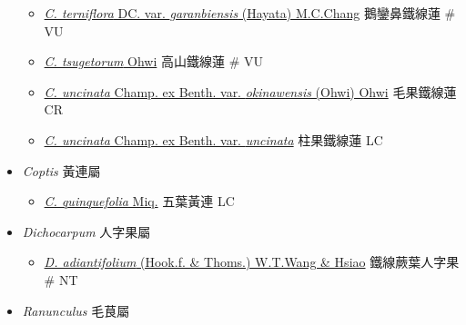 \begin{itemize}
\begin{itemize}
        \item[] \href{http://www.theplantlist.org/tpl1.1/search?q=Clematis+terniflora+var.+garanbiensis}{\textit{C. terniflora} DC. var. \textit{garanbiensis} (Hayata) M.C.Chang}   鵝鑾鼻鐵線蓮  \# VU
        \item[] \href{http://www.theplantlist.org/tpl1.1/search?q=Clematis+tsugetorum}{\textit{C. tsugetorum} Ohwi}   高山鐵線蓮  \# VU
        \item[] \href{http://www.theplantlist.org/tpl1.1/search?q=Clematis+uncinata+var.+okinawensis}{\textit{C. uncinata} Champ. ex Benth. var. \textit{okinawensis} (Ohwi) Ohwi}   毛果鐵線蓮   CR
        \item[] \href{http://www.theplantlist.org/tpl1.1/search?q=Clematis+uncinata+var.+uncinata}{\textit{C. uncinata} Champ. ex Benth. var. \textit{uncinata}}   柱果鐵線蓮   LC
  \end{itemize}
 \item[] \textit{Coptis} 黃連屬
                                
  \begin{itemize}
        \item[] \href{http://www.theplantlist.org/tpl1.1/search?q=Coptis+quinquefolia}{\textit{C. quinquefolia} Miq.}   五葉黃連   LC
  \end{itemize}
 \item[] \textit{Dichocarpum} 人字果屬
                                
  \begin{itemize}
        \item[] \href{http://www.theplantlist.org/tpl1.1/search?q=Dichocarpum+adiantifolium}{\textit{D. adiantifolium} (Hook.f. \& Thoms.) W.T.Wang \& Hsiao}   鐵線蕨葉人字果  \# NT
  \end{itemize}
 \item[] \textit{Ranunculus} 毛茛屬
                                

\end{itemize}
